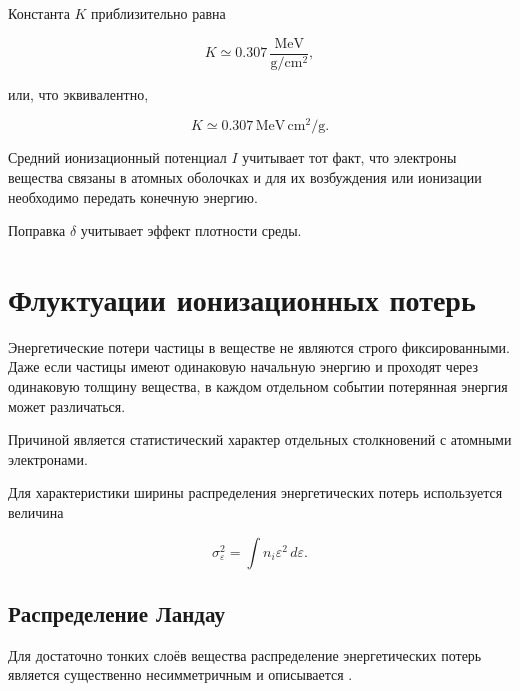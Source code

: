 \documentclass[../final.tex]{subfiles}
\begin{document}
Константа $K$ приблизительно равна

\begin{equation*}
    K
    \simeq
    0.307\,
    \frac{\mathrm{MeV}}{\mathrm{g/cm^2}},
\end{equation*}

или, что эквивалентно,

\begin{equation*}
    K
    \simeq
    0.307\,
    \mathrm{MeV\,cm^2/g}.
\end{equation*}

Средний ионизационный потенциал $I$ учитывает тот факт, что электроны
вещества связаны в атомных оболочках и для их возбуждения или
ионизации необходимо передать конечную энергию.

Поправка $\delta$ учитывает эффект плотности среды.


\section{Флуктуации ионизационных потерь}

Энергетические потери частицы в веществе не являются строго
фиксированными. Даже если частицы имеют одинаковую начальную энергию
и проходят через одинаковую толщину вещества, в каждом отдельном
событии потерянная энергия может различаться.

Причиной является статистический характер отдельных столкновений
с атомными электронами.

Для характеристики ширины распределения энергетических потерь
используется величина

\begin{equation*}
    \sigma_{\varepsilon}^2
    =
    \int
    n_i\varepsilon^2
    \,d\varepsilon.
\end{equation*}


\subsection{Распределение Ландау}

Для достаточно тонких слоёв вещества распределение энергетических
потерь является существенно несимметричным и описывается
.
\end{document}
